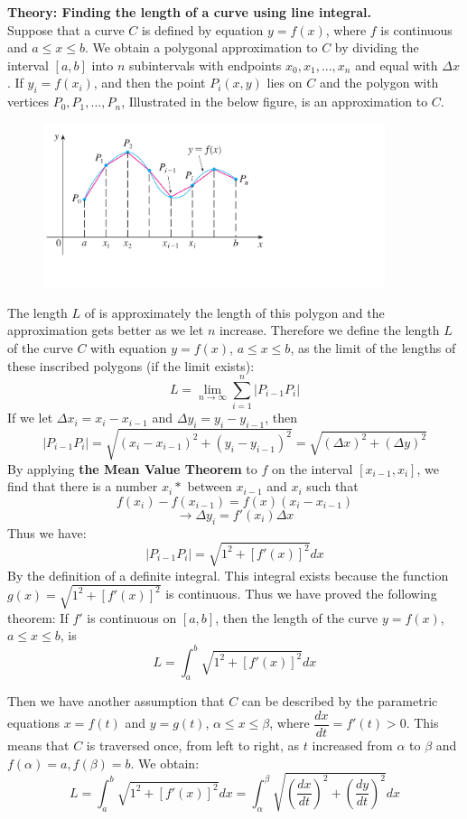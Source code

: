 \textbf{Theory: Finding the length of a curve using line integral.} \\
Suppose that a curve $C$ is defined by equation $y=f(x)$, where $f$ is continuous and $a \leq x \leq b$. We obtain a polygonal approximation to $C$ by dividing the interval $[a,b]$ into $n$ subintervals with endpoints $x_0,x_1,...,x_n$ and equal with $\Delta x$. If $y_i=f(x_i)$, and then the point $P_i(x,y)$ lies on $C$ and the polygon with vertices $P_0,P_1,...,P_n$, Illustrated in the below figure, is an approximation to $C$.
\begin{figure}[H]
  \centering
  \includegraphics[width=10cm]{graphics/3_0.png}
\end{figure}
The length $L$ of is approximately the length of this polygon and the approximation gets better as we let $n$ increase. Therefore we define the length \textbf{$L$} of the curve $C$ with equation $y=f(x)$, $a \leq x \leq b$, as the limit of the lengths of these inscribed polygons (if the limit exists):
$$ L = \lim_{n \to \infty} \sum_{i = 1}^{n}  \left| P_{i-1} P_i \right| $$
If we let $\Delta x_i=x_i-x_{i-1}$ and $\Delta y_i=y_i-y_{i-1}$, then
$$ \left| P_{i-1} P_i \right| = \sqrt{(x_i-x_{i-1})^2 + (y_i-y_{i-1})^2} = \sqrt{(\Delta x)^2 + (\Delta y)^2} $$
By applying \textbf{the Mean Value Theorem} to $f$ on the interval $[x_{i-1},x_i]$, we find that there is a number $x_i*$ between $x_{i-1}$ and $x_i$ such that
$$ f(x_i)-f(x_{i-1})=f(x)(x_i-x_{i-1})$$
$$ \rightarrow \Delta y_i = f'(x_i)\Delta x $$
Thus we have:
$$ \left| P_{i-1} P_i \right| = \sqrt{1^2 + [f'(x)]^2} dx $$
By the definition of a definite integral. This integral exists because the function $g(x) = \sqrt{1^2 + [f'(x)]^2}$ is continuous. Thus we have proved the following theorem:
If $f'$ is continuous on $[a,b]$, then the length of the curve $y=f(x)$, $a \leq x \leq b$, is
$$ L = \int_{a}^{b} \sqrt{1^2 + \left[f'(x)\right]^2} dx  $$

Then we have another assumption that $C$ can be described by the parametric equations $x=f(t)$ and $y=g(t)$, $\alpha \leq x \leq \beta$, where \vspace{0.2cm} $\dfrac{dx}{dt}=f'(t)>0$. This means that $C$ is traversed once, from left to right, as $t$ increased from $\alpha$ to $\beta$ and $f(\alpha)=a, f(\beta)=b$. We obtain:
$$ L = \int_{a}^{b} \sqrt{1^2 + \left[f'(x)\right]^2} dx = \int_{\alpha}^{\beta} \sqrt{\left(\dfrac{dx}{dt}\right)^2 + \left(\dfrac{dy}{dt}\right)^2} dx  $$


